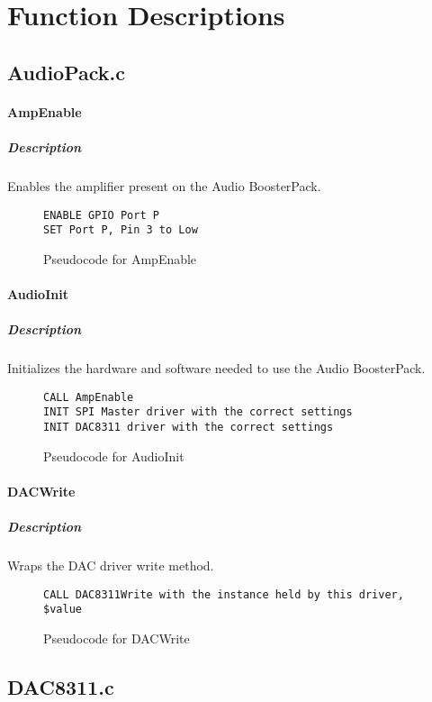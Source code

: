 \documentclass[titlepage]{article}
\begin{document}
\pagebreak
\section{Function Descriptions}

\subsection{AudioPack.c}

\paragraph{AmpEnable}
\subparagraph{Description}
Enables the amplifier present on the Audio BoosterPack\textregistered.
\begin{figure}[H]
    \begin{verbatim}
ENABLE GPIO Port P
SET Port P, Pin 3 to Low
    \end{verbatim}
    \caption{Pseudocode for AmpEnable}
\end{figure}

\paragraph{AudioInit}
\subparagraph{Description}
Initializes the hardware and software needed to use the Audio BoosterPack\textregistered.
\begin{figure}[H]
    \begin{verbatim}
CALL AmpEnable
INIT SPI Master driver with the correct settings
INIT DAC8311 driver with the correct settings
    \end{verbatim}
    \caption{Pseudocode for AudioInit}
\end{figure}

\paragraph{DACWrite}
\subparagraph{Description}
Wraps the DAC driver write method.
\begin{figure}[H]
    \begin{verbatim}
CALL DAC8311Write with the instance held by this driver, $value
    \end{verbatim}
    \caption{Pseudocode for DACWrite}
\end{figure}

\subsection{DAC8311.c}
\end{document}
